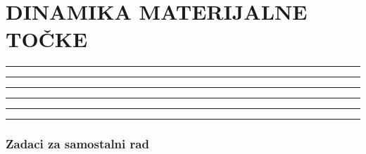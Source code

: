 \documentclass[10pt]{book}
\newcounter{zadatak} %
\newcounter{cjelina}
\begin{document}
\setcounter{zadatak}{0}

\newpage
\chapter{DINAMIKA MATERIJALNE TOČKE}



{\color{boja} \rule{\linewidth}{0.3mm} }

\vspace{0.2cm} 




{\color{boja} \rule{\linewidth}{0.3mm} }

\vspace{0.2cm}





{\color{boja} \rule{\linewidth}{0.3mm} }


\setcounter{zadatak}{0}




{\color{boja} \rule{\linewidth}{0.3mm} }

\vspace{0.2cm} 




{\color{boja} \rule{\linewidth}{0.3mm} }

\vspace{0.2cm}





{\color{boja} \rule{\linewidth}{0.3mm} }


\subsection*{Zadaci za samostalni rad}



\vspace{0.2cm}


\vspace{0.2cm}
\end{document}
